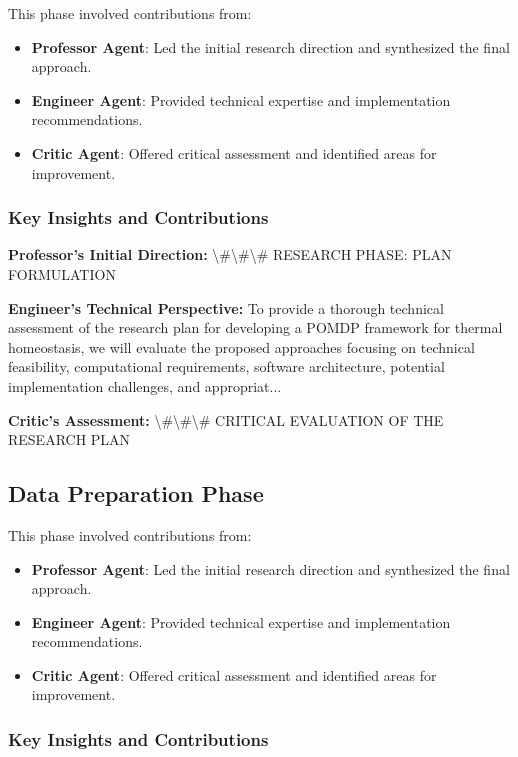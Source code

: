 \documentclass[11pt,a4paper]{article}
\begin{document}
This phase involved contributions from:

\begin{itemize}
\item \textbf{Professor Agent}: Led the initial research direction and synthesized the final approach.
\item \textbf{Engineer Agent}: Provided technical expertise and implementation recommendations.
\item \textbf{Critic Agent}: Offered critical assessment and identified areas for improvement.
\end{itemize}

\subsubsection{Key Insights and Contributions}


\textbf{Professor's Initial Direction:} \textbackslash{}#\textbackslash{}#\textbackslash{}# RESEARCH PHASE: PLAN FORMULATION


\textbf{Engineer's Technical Perspective:} To provide a thorough technical assessment of the research plan for developing a POMDP framework for thermal homeostasis, we will evaluate the proposed approaches focusing on technical feasibility, computational requirements, software architecture, potential implementation challenges, and appropriat...


\textbf{Critic's Assessment:} \textbackslash{}#\textbackslash{}#\textbackslash{}# CRITICAL EVALUATION OF THE RESEARCH PLAN


\subsection{Data Preparation Phase}


This phase involved contributions from:

\begin{itemize}
\item \textbf{Professor Agent}: Led the initial research direction and synthesized the final approach.
\item \textbf{Engineer Agent}: Provided technical expertise and implementation recommendations.
\item \textbf{Critic Agent}: Offered critical assessment and identified areas for improvement.
\end{itemize}

\subsubsection{Key Insights and Contributions}
\end{document}
